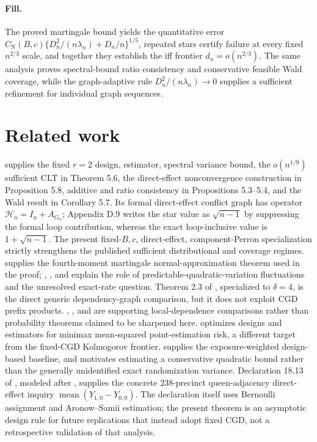 \documentclass{article}
\begin{document}
\paragraph{Fill.} The proved martingale bound yields the quantitative error \(C_{\mathrm N}(B,c)\{D_n^2/(n\lambda_n)+D_n/n\}^{1/5}\), repeated stars certify failure at every fixed \(n^{2/3}\) scale, and together they establish the iff frontier \(d_n=o(n^{2/3})\). The same analysis proves spectral-bound ratio consistency and conservative feasible Wald coverage, while the graph-adaptive rule \(D_n^2/(n\lambda_n)\to0\) supplies a sufficient refinement for individual graph sequences.

\section{Related work}

\cite{KandirosPipisDaskalakisHarshaw2024CGD} supplies the fixed \(r=2\) design, estimator, spectral variance bound, the \(o(n^{1/9})\) sufficient CLT in Theorem 5.6, the direct-effect nonconvergence construction in Proposition 5.8, additive and ratio consistency in Propositions 5.3--5.4, and the Wald result in Corollary 5.7. Its formal direct-effect conflict graph has operator \(\mathcal H_n=I_n+A_{G_n}\); Appendix D.9 writes the star value as \(\sqrt{n-1}\) by suppressing the formal loop contribution, whereas the exact loop-inclusive value is \(1+\sqrt{n-1}\). The present fixed-\(B,c\), direct-effect, component-Perron specialization strictly strengthens the published sufficient distributional and coverage regimes. \cite{HeydeBrown1970DepartureNormality} supplies the fourth-moment martingale normal-approximation theorem used in the proof; \cite{Haeusler1988MartingaleRate}, \cite{Bolthausen1982ExactMartingaleRates}, and \cite{Mourrat2013MartingaleRate} explain the role of predictable-quadratic-variation fluctuations and the unresolved exact-rate question. Theorem 2.3 of \cite{JanischLehericy2024SparseDependencyGraph}, specialized to \(\delta=4\), is the direct generic dependency-graph comparison, but it does not exploit CGD prefix products. \cite{Ross2011FundamentalsStein}, \cite{Chin2019SteinInterference}, and \cite{CaiShaoZhang2026RefinedLocalDependence} are supporting local-dependence comparisons rather than probability theorems claimed to be sharpened here. \cite{KandirosHarshawSavje2026MinimaxNetwork} optimizes designs and estimators for minimax mean-squared point-estimation risk, a different target from the fixed-CGD Kolmogorov frontier. \cite{AronowSamii2017GeneralInterference} supplies the exposure-weighted design-based baseline, and \cite{HarshawMiddletonSavje2026OptimizedVariance} motivates estimating a conservative quadratic bound rather than the generally unidentified exact randomization variance. Declaration 18.13 of \cite{BlairCoppockHumphreys2023ResearchDesign}, modeled after \cite{GreenKrasnoCoppockFarrerLenoirZingher2016LawnSigns}, supplies the concrete \(238\)-precinct queen-adjacency direct-effect inquiry \(\operatorname{mean}(Y_{1,0}-Y_{0,0})\). The declaration itself uses Bernoulli assignment and Aronow--Samii estimation; the present theorem is an asymptotic design rule for future replications that instead adopt fixed CGD, not a retrospective validation of that analysis.
\end{document}
